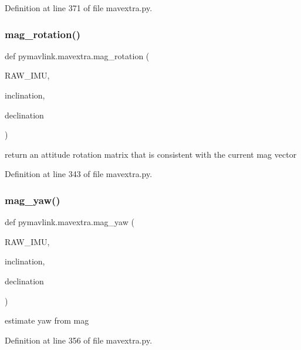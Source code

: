 Definition at line 371 of file mavextra.\+py.

\mbox{\label{namespacepymavlink_1_1mavextra_a55bf2db7a98272c74d86e6e721afddb1}} 
\subsubsection{\texorpdfstring{mag\_rotation()}{mag\_rotation()}}
{\footnotesize\ttfamily def pymavlink.\+mavextra.\+mag\+\_\+rotation (\begin{DoxyParamCaption}\item[{}]{R\+A\+W\+\_\+\+I\+MU,  }\item[{}]{inclination,  }\item[{}]{declination }\end{DoxyParamCaption})}

\begin{DoxyVerb}return an attitude rotation matrix that is consistent with the current mag
   vector\end{DoxyVerb}
 

Definition at line 343 of file mavextra.\+py.

\mbox{\label{namespacepymavlink_1_1mavextra_aa2959db40d0a944e4b7f46e3128df872}} 
\subsubsection{\texorpdfstring{mag\_yaw()}{mag\_yaw()}}
{\footnotesize\ttfamily def pymavlink.\+mavextra.\+mag\+\_\+yaw (\begin{DoxyParamCaption}\item[{}]{R\+A\+W\+\_\+\+I\+MU,  }\item[{}]{inclination,  }\item[{}]{declination }\end{DoxyParamCaption})}

\begin{DoxyVerb}estimate yaw from mag\end{DoxyVerb}
 

Definition at line 356 of file mavextra.\+py.

